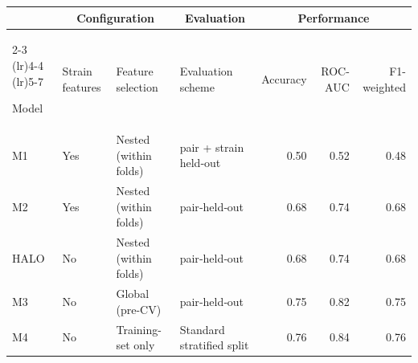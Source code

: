 \documentclass[10pt]{article}
\begin{document}
\begin{table}[t]
    \centering
    \scriptsize
    \setlength{\tabcolsep}{4pt}

    \begin{tabular}{@{} l l l p{3.2cm} r r r @{}}
        \toprule
        \multicolumn{1}{c}{}                       &
        \multicolumn{2}{c}{\textbf{Configuration}} &
        \multicolumn{1}{c}{\textbf{Evaluation}}    &
        \multicolumn{3}{c}{\textbf{Performance}}                                                                                                \\
        \cmidrule(lr){2-3}
        \cmidrule(lr){4-4}
        \cmidrule(lr){5-7}

        Model
                                                   & Strain features
                                                   & Feature selection
                                                   & Evaluation scheme
                                                   & Accuracy
                                                   & ROC-AUC
                                                   & F1-weighted                                                                                \\
        \midrule
        M1                                         & Yes               & Nested (within folds) & pair + strain held‑out    & 0.50 & 0.52 & 0.48 \\
        M2                                         & Yes               & Nested (within folds) & pair‑held‑out             & 0.68 & 0.74 & 0.68 \\
        HALO                                       & No                & Nested (within folds) & pair‑held‑out             & 0.68 & 0.74 & 0.68 \\
        M3                                         & No                & Global (pre-CV)       & pair‑held‑out             & 0.75 & 0.82 & 0.75 \\
        M4                                         & No                & Training-set only     & Standard stratified split & 0.76 & 0.84 & 0.76 \\
        \bottomrule
    \end{tabular}
\end{table}
\end{document}
